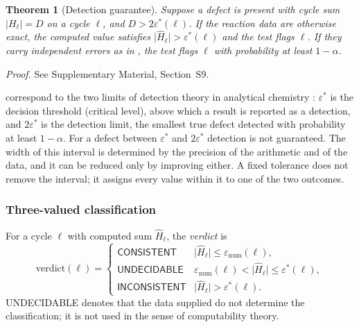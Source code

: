 \documentclass[11pt,a4paper]{article}
\theoremstyle{pstyle}
\newtheorem{theorem}{Theorem}[section]
\theoremstyle{definition}
\theoremstyle{remark}
\newcommand{\abs}[1]{\lvert#1\rvert}
\newcommand{\eps}{\varepsilon}
\newcommand{\epsnum}{\eps_{\mathrm{num}}}
\newcommand{\epsstar}{\eps^{\ast}}
\newcommand{\hol}{H}
\begin{document}
\begin{theorem}[Detection guarantee]
\label{thm:detection}
Suppose a defect is present with cycle sum $\abs{\hol_\ell} = D$ on a
cycle $\ell$, and $D > 2\epsstar(\ell)$. If the reaction data are
otherwise exact, the computed value satisfies
$\abs{\widehat{\hol}_\ell} > \epsstar(\ell)$ and the test flags $\ell$.
If they carry independent errors as in , the test
flags $\ell$ with probability at least $1-\alpha$.
\end{theorem}

\noindent\emph{Proof.} See Supplementary Material, Section~S9.

\begin{remark}
\label{rem:factor2}
 correspond to the two limits
of detection theory in analytical chemistry \citep{currie1968}:
$\epsstar$ is the decision threshold (critical level), above which a
result is reported as a detection, and $2\epsstar$ is the detection
limit, the smallest true defect detected with probability at least
$1-\alpha$. For a defect between $\epsstar$ and $2\epsstar$ detection is
not guaranteed. The width of this interval is determined by the
precision of the arithmetic and of the data, and it can be reduced only
by improving either. A fixed tolerance does not remove the interval; it
assigns every value within it to one of the two outcomes.
\end{remark}

\subsubsection{Three-valued classification}

\begin{definition}[Verdict]
\label{def:verdict}
For a cycle $\ell$ with computed sum $\widehat{\hol}_\ell$, the
\emph{verdict} is
\begin{equation}
  \mathrm{verdict}(\ell) =
  \begin{cases}
    \textsf{CONSISTENT}   & \abs{\widehat{\hol}_\ell} \le
                            \epsnum(\ell),\\[2pt]
    \textsf{UNDECIDABLE}  & \epsnum(\ell) < \abs{\widehat{\hol}_\ell}
                            \le \epsstar(\ell),\\[2pt]
    \textsf{INCONSISTENT} & \abs{\widehat{\hol}_\ell} > \epsstar(\ell).
  \end{cases}
  \label{eq:verdict}
\end{equation}
\textsf{UNDECIDABLE} denotes that the data supplied do not determine the
classification; it is not used in the sense of computability theory.
\end{definition}
\end{document}
